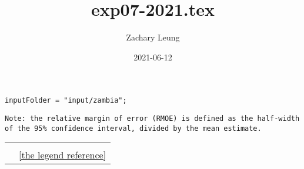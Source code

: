 \documentclass[12pt]{article}
\title{exp07-2021.tex}
\author{Zachary Leung}
\date{2021-06-12}
\begin{document}
\maketitle

\begin{verbatim}
inputFolder = "input/zambia";
\end{verbatim}

\begin{verbatim}
Note: the relative margin of error (RMOE) is defined as the half-width
of the 95% confidence interval, divided by the mean estimate.
\end{verbatim}

\clearpage

\begin{center}
\begin{tabular}{MM}

&

\\[45mm]

&
\ref{the legend reference}
\end{tabular}
\end{center}
\end{document}

